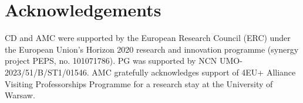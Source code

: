 \documentclass[12pt,a4paper]{amsart}
\begin{document}
\section{Acknowledgements}
\noindent CD and AMC were supported by the European Research Council (ERC) under the European Union’s Horizon 2020 research and innovation programme (synergy project PEPS, no. 101071786). PG was supported by  NCN UMO-2023/51/B/ST1/01546.  AMC gratefully acknowledges support of 4EU+ Alliance Visiting Professorships Programme for a research stay at the University of Warsaw.



\end{document}
